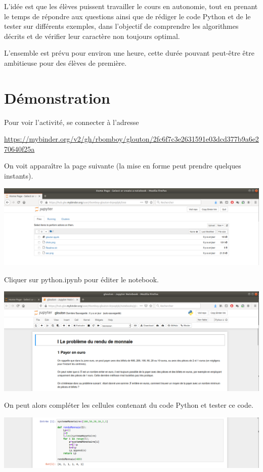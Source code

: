 \documentclass[11pt]{article}
\theoremstyle{plain}
\theoremstyle{definition}
\theoremstyle{remark}
\theoremstyle{exercice}
\begin{document}
\medskip

L'idée est que les élèves puissent travailler le cours en autonomie, tout en prenant le temps de répondre aux questions ainsi que de rédiger le code Python et de le tester sur différents exemples, dans l'objectif de comprendre les algorithmes décrits et de vérifier leur caractère non toujours optimal.

\medskip

L'ensemble est prévu pour environ une heure, cette durée pouvant peut-être être ambitieuse pour des élèves de première.

\section{Démonstration}

Pour voir l'activité, se connecter à l'adresse 

\medskip

{\small \url{https://mybinder.org/v2/gh/rbomboy/glouton/2fc6f7c3e2631591e03dcd377b9a6e270640f25a}}

\medskip

On voit apparaître la page suivante (la mise en forme peut prendre quelques instants).

\begin{center}
\includegraphics[scale=0.25]{page_sommaire}
\end{center}

Cliquer sur python.ipynb pour éditer le notebook.

\begin{center}
\includegraphics[scale=0.25]{notebook}
\end{center}

On peut alors compléter les cellules contenant du code Python et tester ce code.

\begin{center}
\includegraphics[scale=0.25]{code}
\end{center}
\end{document}
